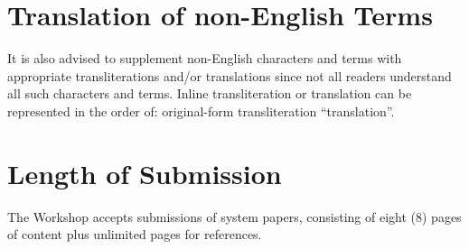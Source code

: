 \documentclass[11pt,a4paper]{article}
\begin{document}



\section{Translation of non-English Terms}

It is also advised to supplement non-English characters and terms
with appropriate transliterations and/or translations
since not all readers understand all such characters and terms.
Inline transliteration or translation can be represented in
the order of: original-form transliteration ``translation''.

\section{Length of Submission}
\label{sec:length}

The \udst{} Workshop accepts submissions of system papers, consisting of eight (8)
pages of content plus unlimited pages for references. 
\end{document}
